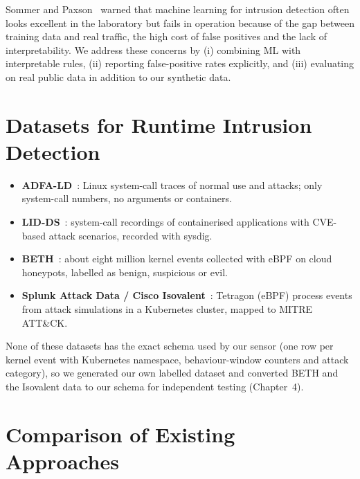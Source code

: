 Sommer and Paxson~\cite{sommer2010} warned that machine learning for intrusion
detection often looks excellent in the laboratory but fails in operation because of the
gap between training data and real traffic, the high cost of false positives and the
lack of interpretability. We address these concerns by (i) combining ML with
interpretable rules, (ii) reporting false-positive rates explicitly, and (iii)
evaluating on real public data in addition to our synthetic data.

\section{Datasets for Runtime Intrusion Detection}

\begin{itemize}
    \item \textbf{ADFA-LD}~\cite{creech2013}: Linux system-call traces of normal use and
          attacks; only system-call numbers, no arguments or containers.
    \item \textbf{LID-DS}~\cite{grimmer2019}: system-call recordings of containerised
          applications with CVE-based attack scenarios, recorded with sysdig.
    \item \textbf{BETH}~\cite{highnam2021}: about eight million kernel events collected
          with eBPF on cloud honeypots, labelled as benign, suspicious or evil.
    \item \textbf{Splunk Attack Data / Cisco Isovalent}~\cite{splunkattack}: Tetragon
          (eBPF) process events from attack simulations in a Kubernetes cluster, mapped to
          MITRE ATT\&CK.
\end{itemize}
None of these datasets has the exact schema used by our sensor (one row per kernel
event with Kubernetes namespace, behaviour-window counters and attack category), so we
generated our own labelled dataset and converted BETH and the Isovalent data to our
schema for independent testing (Chapter~4).

\section{Comparison of Existing Approaches}

